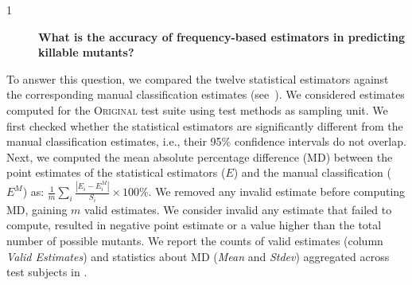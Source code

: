 \documentclass[sigconf]{acmart}
\newcommand{\estimatorCount}{twelve\xspace}
\newcommand{\original}{\textsc{Original}\xspace}
\newcommand{\RQA}{\textcircled{1}\xspace}
\newcommand{\RQAx}{%
\begin{description}\item[\RQA]\textbf{What is the accuracy of frequency-based estimators in predicting killable mutants?}\end{description}}
\begin{document}
\begin{table}[h]
    \caption{Comparison of \emph{mean difference (MD)} between method estimators across test subjects---\original test suites}
    \label{tbl:estoriginal}
\end{table}
\RQAx
To answer this question, we compared 
the \estimatorCount statistical estimators against the corresponding manual classification estimates (see~).
We considered estimates computed for the \original test suite using test methods as sampling unit.
We first checked whether the statistical estimators are significantly different
from the manual classification estimates, i.e.,  their 95\% confidence intervals do not overlap.
Next, we computed the
mean absolute percentage difference (MD) between the point estimates of the
statistical estimators ($E$) and the manual classification ($E^M$) as: $\frac{1}{m}\sum_i{\frac{|E_i - E^M_i|}{S_i}}\times100\%$.
We removed any invalid estimate before computing MD, gaining $m$ valid estimates.
We consider invalid any estimate that failed to compute, resulted in negative point estimate or a value higher than the total number of possible mutants.
We report the counts of valid estimates (column \emph{Valid Estimates})
and statistics about MD (\emph{Mean} and \emph{Stdev}) aggregated across test subjects
in .
\end{document}
